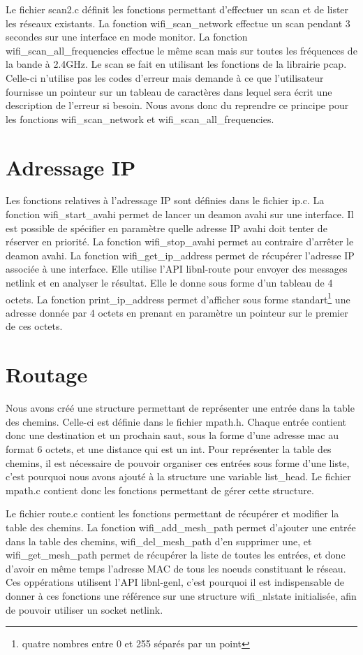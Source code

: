 Le fichier scan2.c définit les fonctions permettant d'effectuer un scan et de lister les réseaux existants. La fonction 
wifi\_\-scan\_\-network effectue un scan pendant 3 secondes sur une interface en mode monitor. La fonction wifi\_\-scan\_\-all\_\-frequencies
effectue le même scan mais sur toutes les fréquences de la bande à 2.4GHz. Le scan se fait en utilisant les fonctions de la 
librairie pcap. Celle-ci n'utilise pas les codes d'erreur mais demande à ce que l'utilisateur fournisse un pointeur sur un tableau de
caractères dans lequel sera écrit une description de l'erreur si besoin. Nous avons donc du reprendre ce principe pour les fonctions
wifi\_\-scan\_\-network et wifi\_\-scan\_\-all\_\-frequencies.

\section{Adressage IP}

Les fonctions relatives à l'adressage IP sont définies dans le fichier ip.c. La fonction wifi\_\-start\_\-avahi permet de lancer un deamon
avahi sur une interface. Il est possible de spécifier en paramètre quelle adresse IP avahi doit tenter de réserver en priorité. La 
fonction wifi\_\-stop\_\-avahi permet au contraire d'arrêter le deamon avahi. La fonction wifi\_\-get\_\-ip\_\-address permet de récupérer l'adresse
IP associée à une interface. Elle utilise l'API libnl-route pour envoyer des messages netlink et en analyser le résultat. Elle  le donne
sous forme d'un tableau de 4 octets. La fonction print\_\-ip\_\-address permet d'afficher sous forme standart\footnote{quatre 
nombres entre 0 et 255 séparés par un point} une adresse donnée par 4 octets en prenant en paramètre un pointeur sur le premier de ces
octets.

\section{Routage}

Nous avons créé une structure permettant de représenter une entrée dans la table des chemins. Celle-ci est définie dans le fichier
mpath.h. Chaque entrée contient donc une destination et un prochain saut, sous la forme d'une adresse mac au format 6 octets, et 
une distance qui est un int. Pour représenter la table des chemins, il est nécessaire de pouvoir organiser ces entrées sous forme 
d'une liste, c'est pourquoi nous avons ajouté à la structure une variable list\_\-head. Le fichier mpath.c contient donc les fonctions
permettant de gérer cette structure.

Le fichier route.c contient les fonctions permettant de récupérer et modifier la table des chemins. La fonction wifi\_\-add\_\-mesh\_\-path
permet d'ajouter une entrée dans la table des chemins, wifi\_\-del\_\-mesh\_\-path d'en supprimer une, et wifi\_\-get\_\-mesh\_\-path permet de 
récupérer la liste de toutes les entrées, et donc d'avoir en même temps l'adresse MAC de tous les noeuds constituant le réseau.
Ces oppérations utilisent l'API libnl-genl, c'est pourquoi il est indispensable de donner à ces fonctions une référence sur une
structure wifi\_\-nlstate initialisée, afin de pouvoir utiliser un socket netlink.